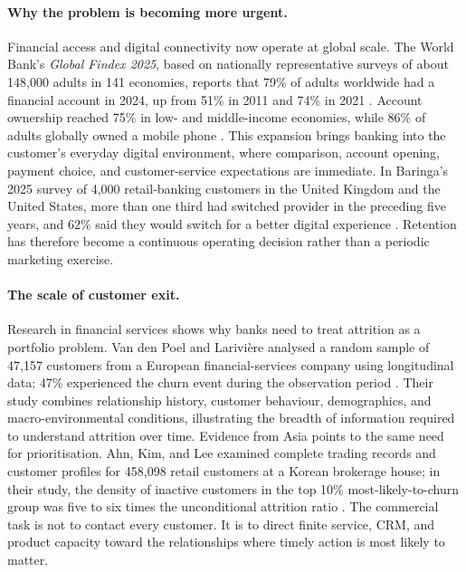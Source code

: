 \documentclass[a4paper,12pt]{article}
\begin{document}
\paragraph*{Why the problem is becoming more urgent.}
Financial access and digital connectivity now operate at global scale. The World Bank's \textit{Global Findex 2025}, based on nationally representative surveys of about 148,000 adults in 141 economies, reports that 79\% of adults worldwide had a financial account in 2024, up from 51\% in 2011 and 74\% in 2021 \citep{worldbank2025,worldbank2025press}. Account ownership reached 75\% in low- and middle-income economies, while 86\% of adults globally owned a mobile phone \citep{worldbank2025}. This expansion brings banking into the customer's everyday digital environment, where comparison, account opening, payment choice, and customer-service expectations are immediate. In Baringa's 2025 survey of 4,000 retail-banking customers in the United Kingdom and the United States, more than one third had switched provider in the preceding five years, and 62\% said they would switch for a better digital experience \citep{baringa2025}. Retention has therefore become a continuous operating decision rather than a periodic marketing exercise.

\paragraph*{The scale of customer exit.}
Research in financial services shows why banks need to treat attrition as a portfolio problem. Van den Poel and Larivi\`ere analysed a random sample of 47,157 customers from a European financial-services company using longitudinal data; 47\% experienced the churn event during the observation period \citep{vandenpoelLariviere2004}. Their study combines relationship history, customer behaviour, demographics, and macro-environmental conditions, illustrating the breadth of information required to understand attrition over time. Evidence from Asia points to the same need for prioritisation. Ahn, Kim, and Lee examined complete trading records and customer profiles for 458,098 retail customers at a Korean brokerage house; in their study, the density of inactive customers in the top 10\% most-likely-to-churn group was five to six times the unconditional attrition ratio \citep{ahnKimLee2020}. The commercial task is not to contact every customer. It is to direct finite service, CRM, and product capacity toward the relationships where timely action is most likely to matter.
\end{document}
